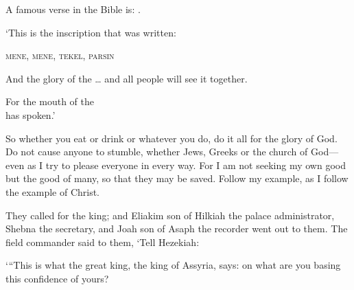 \documentclass{article}
\begin{document}
A famous verse in the Bible is:
.

\begin{scripture}[Daniel 5:25]
`This is the inscription that was
written:
\begin{center}
\textsc{mene, mene, tekel, parsin}
\end{center}
\end{scripture}

\begin{scripture}[Isaiah 40:5]
\begin{poetry}[belowskip = 0pt]
And the glory of the \ldots
and all people will see it together.
\end{poetry}
\begin{flushright}[aboveskip = 0pt]
For the mouth of the  \\
has spoken.'
\end{flushright}
\end{scripture}

\begin{scripture}[1 Corinthians 10:31--11:1]
\begin{midparachap}
So whether you eat or drink or
whatever you do, do it all for the glory of
God. Do not cause anyone to stumble,
whether Jews, Greeks or the church of
God---even as I try to please everyone
in every way. For I am not seeking my own
good but the good of many, so that they may
be saved. Follow my example, as I
follow the example of Christ.
\end{midparachap}
\end{scripture}

\begin{scripture}[2 Kings 18:18--19]
They called for the king; and Eliakim
son of Hilkiah the palace administrator, Shebna
the secretary, and Joah son of Asaph the
recorder went out to them.
The field commander said to them, `Tell
Hezekiah:
\begin{narrow}
`\thinspace``This is what the great king, the
king of Assyria, says: on what are you basing
this confidence of yours?
\end{narrow}
\end{scripture}
\end{document}
